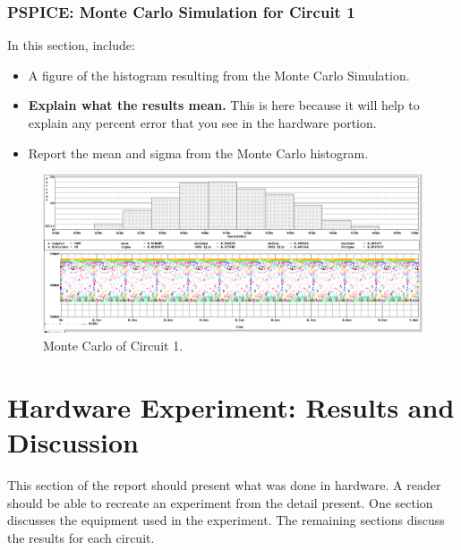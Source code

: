 \documentclass[11pt]{article}
\begin{document}
\subsubsection{PSPICE: Monte Carlo Simulation for Circuit 1}
In this section, include: 
\begin{itemize}
	\item A figure of the histogram resulting from the Monte Carlo Simulation. 
	\item \textbf{Explain what the results mean. }  This is here because it will help to explain any percent error that you see in the hardware portion.
	\item Report the mean and sigma from the Monte Carlo histogram.
\end{itemize}
	\begin{figure}[htbp]
	\centering
	\includegraphics[width=\textwidth]{simulation}
	\caption{Monte Carlo of Circuit 1. }
	\label{Fig:Circuit1MonteCarlo}
\end{figure}

\section{Hardware Experiment: Results and Discussion}
This section of the report should present what was done in hardware.  A reader should be able to recreate an experiment from the detail present.  One section discusses the equipment used in the experiment. The remaining sections discuss the results for each circuit.
\end{document}
